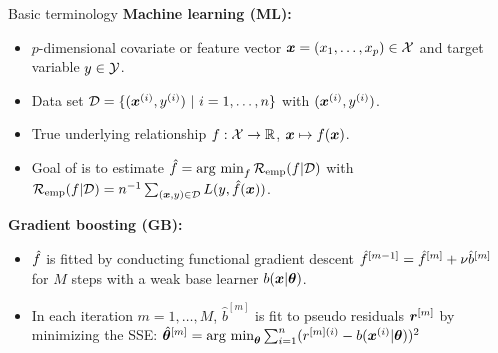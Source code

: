 \documentclass[t,10pt]{beamer}
\begin{document}
%

\begin{frame}{Basic terminology}
  \textbf{Machine learning (ML):}
  \begin{itemize}
    \item
      $p$-dimensional covariate or feature vector $\bm{x} = (x_1, \dots, x_p) \in \mathcal{X}$ and target variable $y\in\mathcal{Y}$.

    \item
      Data set $\mathcal{D} = \{(\bm{x}^{(i)}, y^{(i)})\ |\ i = 1, \dots, n\}$ with $(\bm{x}^{(i)}, y^{(i)})$.%

    \item
      True underlying relationship $f : \mathcal{X} \to \mathbb{R}$, $\bm{x} \mapsto f(\bm{x})$.

    \item
      Goal of is to estimate $\hat{f} = \operatorname{arg~min}_{f} \mathcal{R}_{\text{emp}}(f | \mathcal{D})$ with $\mathcal{R}_{\text{emp}}(f | \mathcal{D}) = n^{-1} \sum_{(\bm{x}, y)\in\mathcal{D}} L(y, \hat{f}(\bm{x}))$.

  \end{itemize}
  \textbf{Gradient boosting (GB):}
  \begin{itemize}
      \item 
        $\hat{f}$ is fitted by conducting functional gradient descent $\hat{f}^{[m-1]} = \hat{f}^{[m]} + \nu \hat{b}^{[m]}$ for $M$ steps with a weak base learner $b(\bm{x} | \bm{\theta})$.

        \item
            In each iteration $m = 1, \dots, M$, $\hat{b}^{[m]}$ is fit to pseudo residuals $\bm{r}^{[m]}$ by minimizing the SSE: $\hat{\bm{\theta}}^{[m]} = \operatorname{arg~min}_{\bm{\theta}} \sum_{i=1}^n(r^{[m](i)} - b(\bm{x}^{(i)} | \bm{\theta}))^2$
  \end{itemize}
\end{frame}
\end{document}

